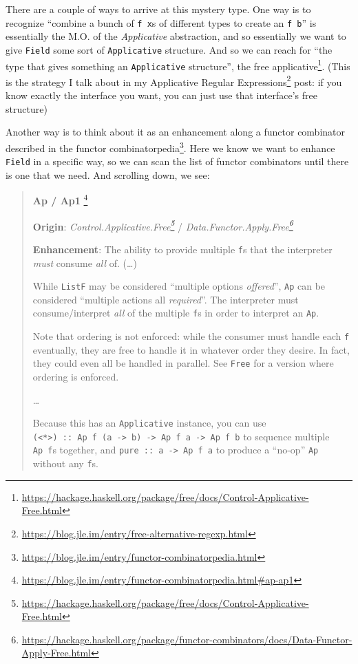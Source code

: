 \documentclass[]{article}
\renewcommand{\href}[2]{#2\footnote{\url{#1}}}
\begin{document}
There are a couple of ways to arrive at this mystery type. One way is to
recognize ``combine a bunch of \texttt{f\ x}s of different types to create an
\texttt{f\ b}'' is essentially the M.O. of the \emph{Applicative} abstraction,
and so essentially we want to give \texttt{Field} some sort of
\texttt{Applicative} structure. And so we can reach for ``the type that gives
something an \texttt{Applicative} structure'', the
\href{https://hackage.haskell.org/package/free/docs/Control-Applicative-Free.html}{free
applicative}. (This is the strategy I talk about in my
\href{https://blog.jle.im/entry/free-alternative-regexp.html}{Applicative
Regular Expressions} post: if you know exactly the interface you want, you can
just use that interface's free structure)

Another way is to think about it as an enhancement along a functor combinator
described in the
\href{https://blog.jle.im/entry/functor-combinatorpedia.html}{functor
combinatorpedia}. Here we know we want to enhance \texttt{Field} in a specific
way, so we can scan the list of functor combinators until there is one that we
need. And scrolling down, we see:

\begin{quote}
\href{https://blog.jle.im/entry/functor-combinatorpedia.html\#ap-ap1}{\textbf{Ap
/ Ap1 }}

\textbf{Origin}:
\emph{\href{https://hackage.haskell.org/package/free/docs/Control-Applicative-Free.html}{Control.Applicative.Free}}
/
\emph{\href{https://hackage.haskell.org/package/functor-combinators/docs/Data-Functor-Apply-Free.html}{Data.Functor.Apply.Free}}

\textbf{Enhancement}: The ability to provide multiple \texttt{f}s that the
interpreter \emph{must} consume \emph{all} of. (\ldots)

While \texttt{ListF} may be considered ``multiple options \emph{offered}'',
\texttt{Ap} can be considered ``multiple actions all \emph{required}''. The
interpreter must consume/interpret \emph{all} of the multiple \texttt{f}s in
order to interpret an \texttt{Ap}.

Note that ordering is not enforced: while the consumer must handle each
\texttt{f} eventually, they are free to handle it in whatever order they desire.
In fact, they could even all be handled in parallel. See \texttt{Free} for a
version where ordering is enforced.

\ldots{}

Because this has an \texttt{Applicative} instance, you can use
\texttt{(\textless{}*\textgreater{})\ ::\ Ap\ f\ (a\ -\textgreater{}\ b)\ -\textgreater{}\ Ap\ f\ a\ -\textgreater{}\ Ap\ f\ b}
to sequence multiple \texttt{Ap\ f}s together, and
\texttt{pure\ ::\ a\ -\textgreater{}\ Ap\ f\ a} to produce a ``no-op''
\texttt{Ap} without any \texttt{f}s.
\end{quote}
\end{document}
